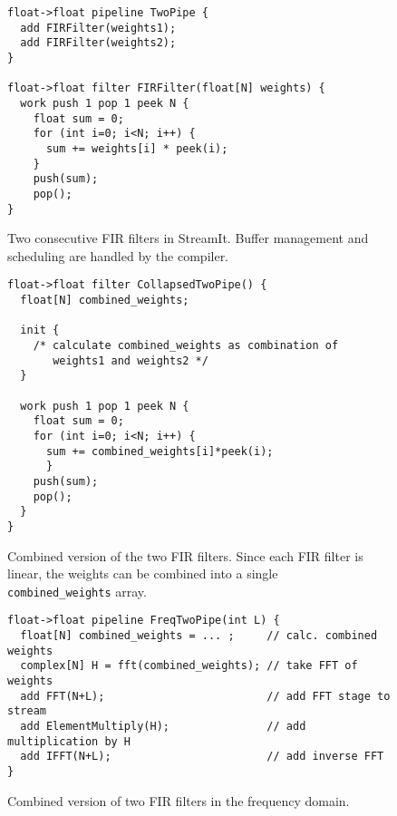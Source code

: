 \begin{figure}[t]
\scriptsize
\begin{verbatim}
float->float pipeline TwoPipe {
  add FIRFilter(weights1);
  add FIRFilter(weights2);
}

float->float filter FIRFilter(float[N] weights) {
  work push 1 pop 1 peek N {
    float sum = 0;
    for (int i=0; i<N; i++) {
      sum += weights[i] * peek(i);
    }
    push(sum);
    pop();
}
\end{verbatim}
\vspace{-18pt}
\caption{Two consecutive FIR filters in StreamIt.  Buffer management
and scheduling are handled by the compiler.\protect\label{fig:example-streamit}}
\vspace{6pt}
\begin{verbatim}
float->float filter CollapsedTwoPipe() {
  float[N] combined_weights;

  init {
    /* calculate combined_weights as combination of 
       weights1 and weights2 */
  }

  work push 1 pop 1 peek N {
    float sum = 0;
    for (int i=0; i<N; i++) {
      sum += combined_weights[i]*peek(i);
      }
    push(sum);
    pop();
  }
}
\end{verbatim}
\vspace{-18pt}
\caption{Combined version of the two FIR filters.  Since each FIR
filter is linear, the weights can be combined into a single {\tt
combined\_weights} array.\protect\label{fig:example-combine}}
\vspace{6pt}
\begin{verbatim}
float->float pipeline FreqTwoPipe(int L) {
  float[N] combined_weights = ... ;     // calc. combined weights 
  complex[N] H = fft(combined_weights); // take FFT of weights     
  add FFT(N+L);                         // add FFT stage to stream 
  add ElementMultiply(H);               // add multiplication by H 
  add IFFT(N+L);                        // add inverse FFT         
}
\end{verbatim}
\vspace{-12pt}
\caption{Combined version of two FIR filters in the frequency domain.
\protect\label{fig:example-frequency}}
\vspace{-12pt}
\end{figure}

